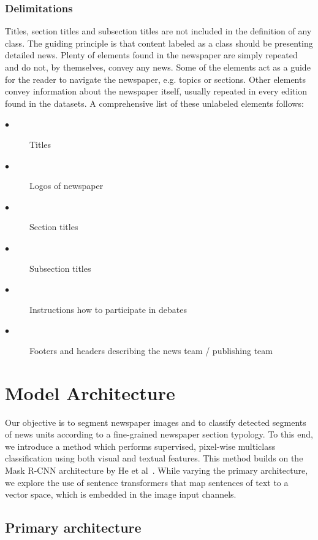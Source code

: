\documentclass[english, bibtex]{kththesis}
\begin{document}
\subsubsection{Delimitations}

Titles, section titles and subsection titles are not included in the definition of any class. The guiding principle is that content labeled as a class should be presenting detailed news. Plenty of elements found in the newspaper are simply repeated and do not, by themselves, convey any news. Some of the elements act as a guide for the reader to navigate the newspaper, e.g. topics or sections. Other elements convey information about the newspaper itself, usually repeated in every edition found in the datasets. A comprehensive list of these unlabeled elements follows:

\begin{description}
\item[$\bullet$] Titles
\item[$\bullet$] Logos of newspaper
\item[$\bullet$] Section titles
\item[$\bullet$] Subsection titles
\item[$\bullet$] Instructions how to participate in debates
\item[$\bullet$] Footers and headers describing the news team / publishing team
\end{description}

\clearpage

\section{Model Architecture}
\label{sec:modelarch}

Our objective is to segment newspaper images and to classify detected segments of news units according to a fine-grained newspaper section typology. To this end, we introduce a method which performs supervised, pixel-wise multiclass classification using both visual and textual features. This method builds on the Mask R-CNN architecture by He et al~\cite{DBLP:journals/corr/HeGDG17}. While varying the primary architecture, we explore the use of sentence transformers that map sentences of text to a vector space, which is embedded in the image input channels.

\subsection{Primary architecture}
\end{document}

